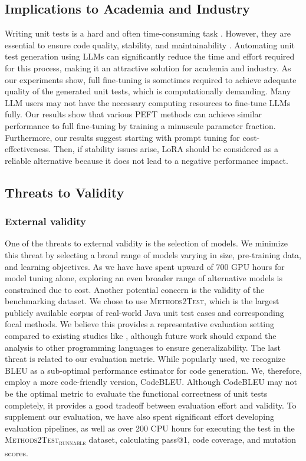 \documentclass[12pt]{book}
\begin{document}
\subsection{Implications to Academia and Industry}
Writing unit tests is a hard and often time-consuming task \citep{7102609}. However, they are essential to ensure code quality, stability, and maintainability \citep{Gonzalez2017ALS}. Automating unit test generation using LLMs can significantly reduce the time and effort required for this process, making it an attractive solution for academia and industry. As our experiments show, full fine-tuning is sometimes required to achieve adequate quality of the generated unit tests, which is computationally demanding. Many LLM users may not have the necessary computing resources to fine-tune LLMs fully. Our results show that various PEFT methods can achieve similar performance to full fine-tuning by training a minuscule parameter fraction. Furthermore, our results suggest starting with prompt tuning for cost-effectiveness. Then, if stability issues arise, LoRA should be considered as a reliable alternative because it does not lead to a negative performance impact. 

\subsection{Threats to Validity}

\subsubsection{External validity}
One of the threats to external validity is the selection of models. We minimize this threat by selecting a broad range of models varying in size, pre-training data, and learning objectives. As we have have spent upward of 700 GPU hours for model tuning alone, exploring an even broader range of alternative models is constrained due to cost. Another potential concern is the validity of the benchmarking dataset. We chose to use \textsc{Methods2Test}, which is the largest publicly available corpus of real-world Java unit test cases and corresponding focal methods. We believe this provides a representative evaluation setting compared to existing studies like \citet{alagarsamy2024a3test}, although future work should expand the analysis to other programming languages to ensure generalizability. The last threat is related to our evaluation metric. While popularly used, we recognize BLEU as a sub-optimal performance estimator for code generation. We, therefore, employ a more code-friendly version, CodeBLEU. Although CodeBLEU may not be the optimal metric to evaluate the functional correctness of unit tests completely, it provides a good tradeoff between evaluation effort and validity. To supplement our evaluation, we have also spent significant effort developing evaluation pipelines, as well as over 200 CPU hours for executing the test in the \textsc{Methods2Test\textsubscript{runnable}} dataset, calculating pass@1, code coverage, and mutation scores.
\end{document}
